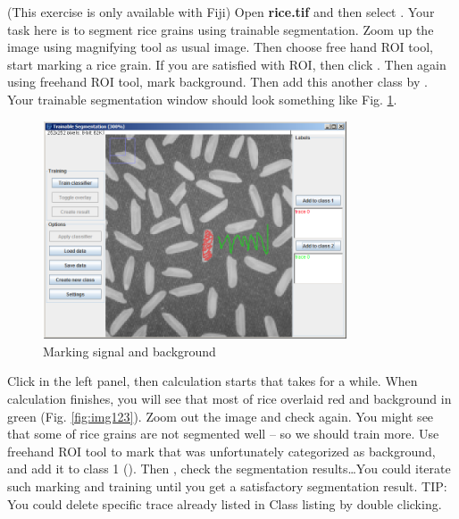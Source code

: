 \begin{indentexercise}{1}
(This exercise is only available with Fiji)
Open \textbf{rice.tif} and then select . Your task here is to segment rice grains using trainable segmentation. Zoom up the image
using magnifying tool as usual image. Then choose free hand ROI tool,
start marking a rice grain. If you are satisfied with ROI, then click
. Then
again using freehand ROI tool, mark background. Then add this another
class by . Your trainable segmentation window should look
something like Fig. \ref{fig:img122}. 

\begin{figure}[htbp]
\begin{center}
\includegraphics[width=9.001cm,height=6.447cm]{fig/CMCIBasicCourse201102-img122.png}
\caption{ Marking signal and background}
\label{fig:img122}
\end{center}
\end{figure}

Click  in the left panel, then calculation starts that takes for a while. When
calculation finishes, you will see that most of rice overlaid red and background in green (Fig. \ref{fig:img123}). Zoom out the image and check again. You might see that some of rice grains are not segmented well -- so we should train more. Use freehand ROI tool to mark that was unfortunately categorized
as background, and add it to class 1 (). Then , check the segmentation results\ldots You
could iterate such marking and training until you get a satisfactory
segmentation result. TIP: You could delete specific trace already
listed in Class listing by double clicking.


\end{indentexercise}
